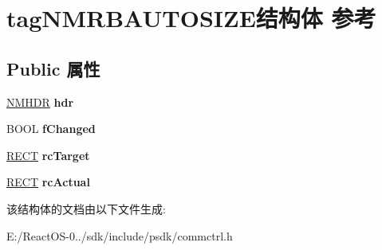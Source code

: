 \hypertarget{structtag_n_m_r_b_a_u_t_o_s_i_z_e}{}\section{tag\+N\+M\+R\+B\+A\+U\+T\+O\+S\+I\+Z\+E结构体 参考}
\label{structtag_n_m_r_b_a_u_t_o_s_i_z_e}
\subsection*{Public 属性}
\begin{DoxyCompactItemize}
\item 
\mbox{\label{structtag_n_m_r_b_a_u_t_o_s_i_z_e_a98aa23fa18ec23014d81d89630e821eb}} 
\hyperlink{structtag_n_m_h_d_r}{N\+M\+H\+DR} {\bfseries hdr}
\item 
\mbox{\label{structtag_n_m_r_b_a_u_t_o_s_i_z_e_a199dd66c4af1e3f496c240cc65255b69}} 
B\+O\+OL {\bfseries f\+Changed}
\item 
\mbox{\label{structtag_n_m_r_b_a_u_t_o_s_i_z_e_ab536cddeb2d42bc212517100168aeec2}} 
\hyperlink{structtag_r_e_c_t}{R\+E\+CT} {\bfseries rc\+Target}
\item 
\mbox{\label{structtag_n_m_r_b_a_u_t_o_s_i_z_e_a59f3c1b5dfe4263ca98b76b49842669a}} 
\hyperlink{structtag_r_e_c_t}{R\+E\+CT} {\bfseries rc\+Actual}
\end{DoxyCompactItemize}


该结构体的文档由以下文件生成\+:\begin{DoxyCompactItemize}
\item 
E\+:/\+React\+O\+S-\/0../sdk/include/psdk/commctrl.\+h\end{DoxyCompactItemize}
